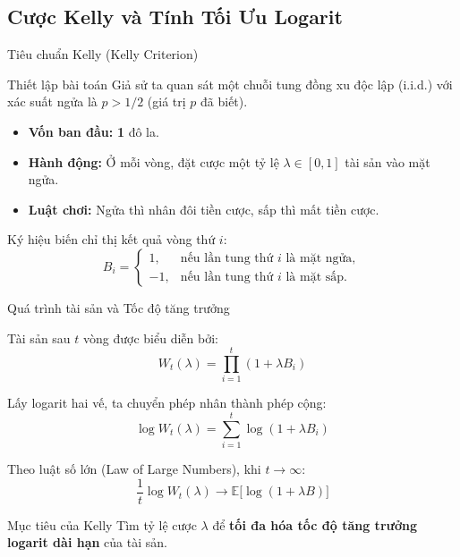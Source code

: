 \subsection{Cược Kelly và Tính Tối Ưu Logarit}

\begin{frame}{Tiêu chuẩn Kelly (Kelly Criterion)}

\begin{block}{Thiết lập bài toán}
Giả sử ta quan sát một chuỗi tung đồng xu độc lập (i.i.d.) với xác suất ngửa là $p > 1/2$ (giá trị $p$ đã biết).
\end{block}

\begin{itemize}
    \item \textbf{Vốn ban đầu:} \textbf{1} đô la.
    \item \textbf{Hành động:} Ở mỗi vòng, đặt cược một tỷ lệ $\lambda \in [0,1]$ tài sản vào mặt ngửa.
    \item \textbf{Luật chơi:} Ngửa thì nhân đôi tiền cược, sấp thì mất tiền cược.
\end{itemize}

\vspace{0.2cm}
Ký hiệu biến chỉ thị kết quả vòng thứ $i$:
\[
B_i =
\begin{cases}
1, & \text{nếu lần tung thứ } i \text{ là mặt ngửa},\\
-1, & \text{nếu lần tung thứ } i \text{ là mặt sấp}.
\end{cases}
\]

\end{frame}

\begin{frame}{Quá trình tài sản và Tốc độ tăng trưởng}

Tài sản sau $t$ vòng được biểu diễn bởi:
\[
W_t(\lambda) = \prod_{i=1}^{t} \left(1+\lambda B_i\right)
\]

Lấy logarit hai vế, ta chuyển phép nhân thành phép cộng:
\[
\log W_t(\lambda) = \sum_{i=1}^{t} \log\left(1+\lambda B_i\right)
\]

Theo luật số lớn (Law of Large Numbers), khi $t \to \infty$:
\[
\frac{1}{t}\log W_t(\lambda) \to \mathbb{E} \big[ \log(1+\lambda B) \big]
\]

\begin{alertblock}{Mục tiêu của Kelly}
Tìm tỷ lệ cược $\lambda$ để \textbf{tối đa hóa tốc độ tăng trưởng logarit dài hạn} của tài sản.
\end{alertblock}

\end{frame}

